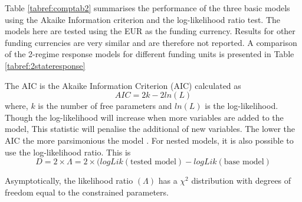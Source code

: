 \documentclass[12pt, a4paper, oneside]{article} %
\begin{document}
Table \ref{tabref:comptab2} summarises the performance of the three basic models using the Akaike Information criterion and the log-likelihood ratio test.  The models here are tested using the EUR as the funding currency.  Results for other funding currencies are very similar and are therefore not reported.  A comparison of the 2-regime response models for different funding units is presented in Table \ref{tabref:2stateresponse} 

The AIC is the Akaike Information Criterion (AIC) calculated as 
\begin{equation}
AIC = 2k - 2ln(L) 
\end{equation}
where, $k$ is the number of free parameters and $ln(L)$ is the log-likelihood.  Though the log-likelihood will increase when more variables are added to the model, This statistic will penalise the additional of new variables.  The lower the AIC the more parsimonious the model \citet{AIC}. For nested models, it is also possible to use the log-likelihood ratio.  This is 
\begin{equation}
D = 2 \times \Lambda = 2 \times (logLik(\text{tested model}) - logLik(\text{base model})
\end{equation}

Asymptotically, the likelihood ratio $(\Lambda)$ has a $\chi^2$ distribution with degrees of freedom equal to the constrained parameters. 
\end{document}

